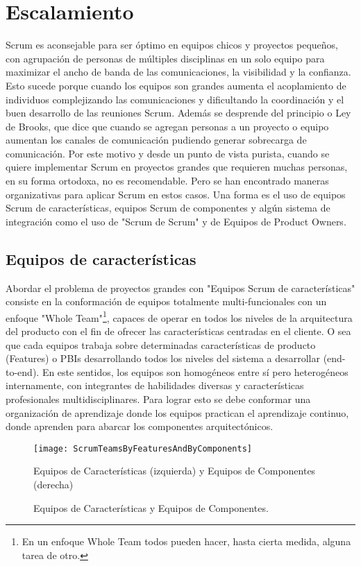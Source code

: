 \chapter{Escalamiento}

Scrum es aconsejable para ser óptimo en equipos chicos y proyectos pequeños, con agrupación de personas de múltiples disciplinas en un solo equipo para maximizar el ancho de banda de las comunicaciones, la visibilidad y la confianza. Esto sucede porque cuando los equipos son grandes aumenta el acoplamiento de individuos complejizando las comunicaciones y dificultando la coordinación y el buen desarrollo de las reuniones Scrum. Además se desprende del principio o Ley de Brooks, que dice que cuando se agregan personas a un proyecto o equipo aumentan los canales de comunicación pudiendo generar sobrecarga de comunicación. Por este motivo y desde un punto de vista purista, cuando se quiere implementar Scrum en proyectos grandes que requieren muchas personas, en su forma ortodoxa, no es recomendable. Pero se han encontrado maneras organizativas para aplicar Scrum en estos casos. Una forma es el uso de equipos Scrum de características, equipos Scrum de componentes y algún sistema de integración como el uso de "Scrum de Scrum" y de Equipos de Product Owners.

\section{Equipos de características}

Abordar el problema de proyectos grandes con "Equipos Scrum de características" consiste en la conformación de equipos totalmente multi-funcionales con un enfoque "Whole Team"\footnote{En un enfoque Whole Team todos pueden hacer, hasta cierta medida, alguna tarea de otro\cite{Juan-Gabardini-2015}.}, capaces de operar en todos los niveles de la arquitectura del producto con el fin de ofrecer las características centradas en el cliente. O sea que cada equipos trabaja sobre determinadas características de producto (Features) o PBIs desarrollando todos los niveles del sistema a desarrollar (end-to-end). En este sentidos, los equipos son homogéneos entre sí pero heterogéneos internamente, con integrantes de habilidades diversas y características profesionales multidisciplinares. Para lograr esto se debe conformar una organización de aprendizaje donde los equipos practican el aprendizaje continuo, donde aprenden para abarcar los componentes arquitectónicos.

\begin{figure}[h]
  \centering
  \texttt{[image: ScrumTeamsByFeaturesAndByComponents]}
  \caption{Equipos de Características y Equipos de Componentes.}
  Equipos de Características (izquierda) y Equipos de Componentes (derecha)
  \centering
  \label{fig:ScrumTeamsByFeaturesAndByComponents} %
\end{figure}

